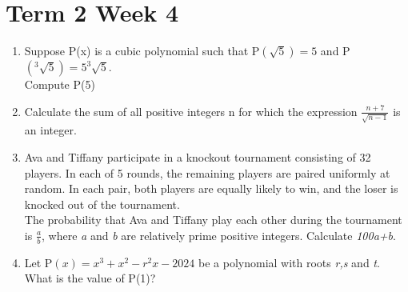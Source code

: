 \documentclass[../main.tex]{subfiles}
\begin{document}
\section*{Term 2 Week 4}
\begin{enumerate}
    \item 
    Suppose P(x) is a cubic polynomial such that P\((\sqrt{5})=5\) and P\((^3\sqrt{5})=5 ^3\sqrt{5}\).\\

    Compute P(5)\\

    \item 
    Calculate the sum of all positive integers n for which the expression \(\frac{n+7}{\sqrt{n-1}}\) is an integer.\\

    \item 
    Ava and Tiffany participate in a knockout tournament consisting of 32 players. In each of 5 rounds, the remaining players are paired uniformly at random. In each pair, both players are equally likely to win, and the loser is knocked out of the tournament. \\

    The probability that Ava and Tiffany play each other during the tournament is \(\frac{a}{b}\), where \textit{a} and \textit{b} are relatively prime positive integers. Calculate \textit{100a+b}.\\

    \item 
    Let P\((x)=x^3+x^2-r^2x-2024\) be a polynomial with roots \textit{r,s} and \textit{t}. What is the value of P(1)?

    
\end{enumerate}
\end{document}
